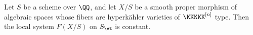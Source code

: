 \begin{theorem}\label{thm:k3n_monodromy}
    Let $S$ be a scheme over $\QQ$, and let $X/S$ be a smooth proper morphism of algebraic spaces whose fibers are hyperk\"ahler varieties of $\KKKKK^{[n]}$ type. Then the local system $F(X/S)$ on $S_{\et}$ is constant.
\end{theorem}
%
%
%
%
